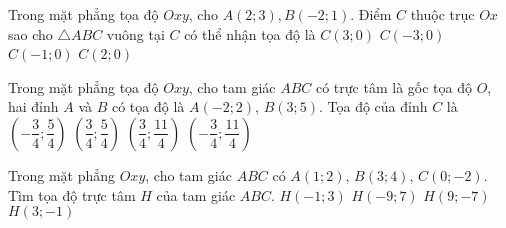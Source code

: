 \begin{ex}%
	Trong mặt phẳng tọa độ $ Oxy $, cho $ A(2;3), B(-2;1) $. Điểm $ C $ thuộc trục $ Ox $ sao cho $ \triangle ABC $ vuông tại $ C $ có thể nhận tọa độ là
	\choice
	{$ C(3;0) $}
	{$ C(-3;0) $}
	{\True$ C(-1;0) $}
	{$ C(2;0) $}
\end{ex}

\begin{ex}%
	Trong mặt phẳng tọa độ $Oxy$, cho tam giác $ABC$ có trực tâm là gốc tọa độ $O$, hai đỉnh $A$ và $B$ có tọa độ là $A(-2;2)$, $B(3;5)$. Tọa độ của đỉnh $C$ là
	\choice
	{\True $\left( -\dfrac{3}{4};\dfrac{5}{4} \right)$}
	{$\left( \dfrac{3}{4};\dfrac{5}{4} \right)$}
	{$\left( \dfrac{3}{4};\dfrac{11}{4} \right)$}
	{$\left( -\dfrac{3}{4};\dfrac{11}{4} \right)$}
\end{ex}

\begin{ex}%
	Trong mặt phẳng $Oxy$, cho tam giác $ABC$ có $A(1;2)$, $B(3;4)$, $C(0;-2)$. Tìm tọa độ trực tâm $H$ của tam giác $ABC$.
	\choice
	{$H(-1;3)$}
	{\True $H(-9;7)$}
	{$H(9;-7)$}
	{$H(3;-1)$}
\end{ex}

